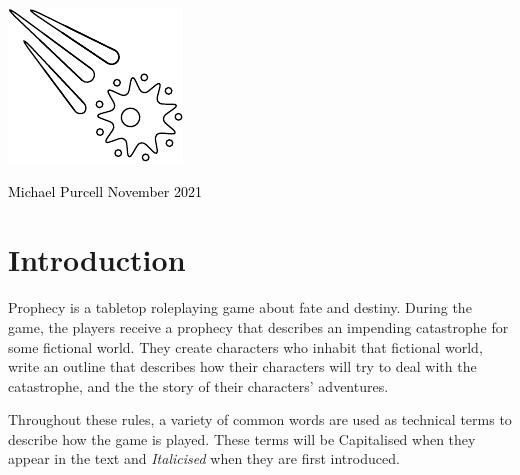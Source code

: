 \documentclass[12pt, a5paper, parskip=half-]{scrartcl}
\begin{document}
\begin{titlepage}
		\enlargethispage{5\baselineskip}

         \setmainfont{Cinzel Decorative}
	    \centering{
			{\fontsize{60}{72}\selectfont
			{\textcolor{black}{pROpHecY}}}
		}


		\setmainfont{URWClassico}
		\vspace{10mm}
		\centering{\Large{{\textcolor{black}
{A tabletop roleplaying game\\ \smallskip about fate and destiny}}}}

\vfill

\includegraphics[scale=3.85]{Images/comet_diagram.pdf}

		\vfill
		
		\raggedright{\Large{{\textcolor{black}{Michael Purcell \hfill November 2021}}}}

\end{titlepage}



\setmainfont{URWClassico}
\normalsize
\raggedright
\section*{Introduction}
Prophecy is a tabletop roleplaying game about fate and destiny. During the game, the players receive a prophecy that describes an impending catastrophe for some fictional world. They create characters who inhabit that fictional world, write an outline that describes how their characters will try to deal with the catastrophe, and the the story of their characters' adventures.

Throughout these rules, a variety of common words are used as technical terms to describe how the game is played. These terms will be Capitalised when they appear in the text and \emph{Italicised} when they are first introduced.
\end{document}
